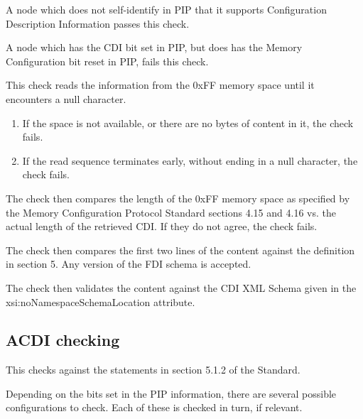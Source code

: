 A node which does not self-identify in PIP that it supports
Configuration Description Information passes this check.

A node which has the CDI bit set in PIP, but does
has the Memory Configuration bit reset in PIP, fails this check.
\pipsetFootnote

This check reads the information from the 0xFF memory space
until it encounters a null character.
\begin{enumerate}
\item If the space is not available, or there are no bytes of content in it, the check fails.
\item If the read sequence terminates early, without ending in a null character, the check fails.
\end{enumerate}
 
The check then compares the length of the 0xFF memory space 
as specified by the Memory Configuration Protocol Standard sections 4.15 and 4.16
vs. the actual length of the retrieved CDI.
If they do not agree, the check fails.

The check then compares the first two lines of the content against the 
definition in section 5. 
Any version of the FDI schema is accepted.

The check then validates the content against the CDI XML Schema
given in the xsi:noNamespaceSchemaLocation attribute.

\subsection{ACDI checking}

This checks against the statements in section 5.1.2 of the Standard.

Depending on the bits set in the PIP information, there are several 
possible configurations to check. Each of these is checked in turn, if relevant.

